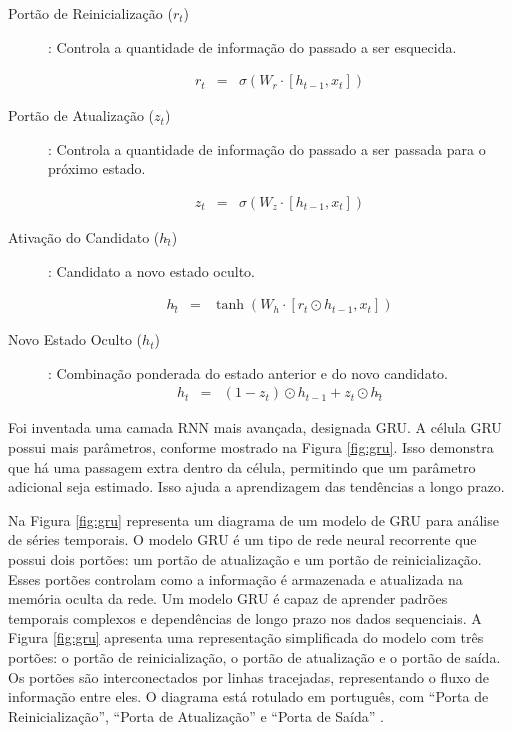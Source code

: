  \begin{description}
 	\item[Portão de Reinicialização (\(r_t\))]: Controla a quantidade de informação do passado a ser esquecida.
 	
 	\begin{eqnarray}
 		r_t &=& \sigma(W_r \cdot [h_{t-1}, x_t])\label{eq:gru}
 	\end{eqnarray} 
 	
 	\item[Portão de Atualização (\(z_t\))]: Controla a quantidade de informação do passado a ser passada para o próximo estado.
 	
 	\begin{eqnarray}
 		z_t &=& \sigma(W_z \cdot [h_{t-1}, x_t])\label{eq:gru1}
 	\end{eqnarray}
 	
 	\item[Ativação do Candidato (\(h\widetilde{_t}\))]: Candidato a novo estado oculto.
 	
 	\begin{eqnarray}
 		h\widetilde{_t} &=& \tanh\left(W_h \cdot [r_t \odot h_{t-1}, x_t]\right)\label{eq:gru2}
 	\end{eqnarray}
 	
 	\item[Novo Estado Oculto (\(h_t\))]: Combinação ponderada do estado anterior e do novo candidato.
 	\begin{eqnarray}
 		h_t &=& (1 - z_t) \odot h_{t-1} + z_t \odot h\widetilde{_t}\label{eq:gru3}
 	\end{eqnarray}
 \end{description}
 
 
 
 Foi inventada uma camada RNN mais avançada, designada GRU. A célula GRU possui mais parâmetros, conforme mostrado na Figura \ref{fig:gru}. Isso demonstra que há uma passagem extra dentro da célula, permitindo que um parâmetro adicional seja estimado. Isso ajuda a aprendizagem das tendências a longo prazo.
 
 Na Figura \ref{fig:gru} representa um diagrama de um modelo de GRU para análise de séries temporais. O modelo GRU é um tipo de rede neural recorrente que possui dois portões: um portão de atualização e um portão de reinicialização. Esses portões controlam como a informação é armazenada e atualizada na memória oculta da rede. Um modelo GRU é capaz de aprender padrões temporais complexos e dependências de longo prazo nos dados sequenciais. A Figura \ref{fig:gru} apresenta uma representação simplificada do modelo com três portões: o portão de reinicialização, o portão de atualização e o portão de saída. Os portões são interconectados por linhas tracejadas, representando o fluxo de informação entre eles. O diagrama está rotulado em português, com ``Porta de Reinicialização'', ``Porta de Atualização'' e ``Porta de Saída'' \cite{Saranya2020, Jordan2021, Khan2022}.
 
